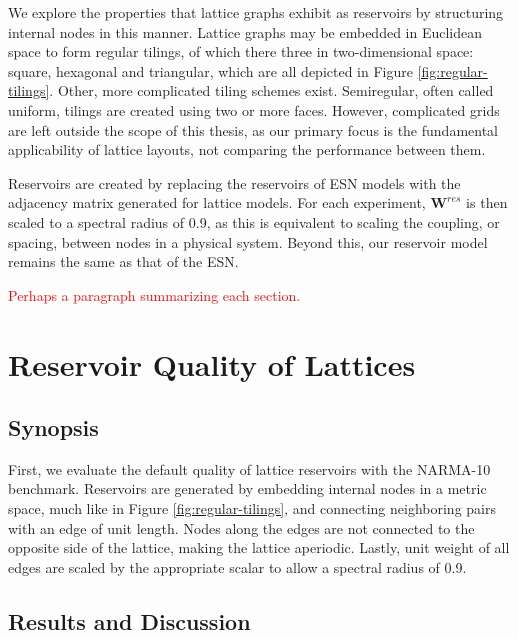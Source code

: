 We explore the properties that lattice graphs exhibit as reservoirs by
structuring internal nodes in this manner. Lattice graphs may be embedded in
Euclidean space to form regular tilings, of which there three in two-dimensional
space: square, hexagonal and triangular, which are all depicted in Figure
\ref{fig:regular-tilings}. Other, more complicated tiling schemes
exist. Semiregular, often called uniform, tilings are created using two or more
faces. However, complicated grids are left outside the scope of this thesis, as
our primary focus is the fundamental applicability of lattice layouts, not
comparing the performance between them.

Reservoirs are created by replacing the reservoirs of ESN models with the
adjacency matrix generated for lattice models. For each experiment,
$\mathbf{W}^{res}$ is then scaled to a spectral radius of 0.9, as this is
equivalent to scaling the coupling, or spacing, between nodes in a physical
system. Beyond this, our reservoir model remains the same as that of the ESN.

\textcolor{red}{
  Perhaps a paragraph summarizing each section.
}

\section{Reservoir Quality of Lattices}
\label{sec:lattice-quality}

\subsection{Synopsis}

First, we evaluate the default quality of lattice reservoirs with the NARMA-10
benchmark. Reservoirs are generated by embedding internal nodes in a metric
space, much like in Figure \ref{fig:regular-tilings}, and connecting neighboring
pairs with an edge of unit length. Nodes along the edges are not connected to
the opposite side of the lattice, making the lattice aperiodic. Lastly, unit
weight of all edges are scaled by the appropriate scalar to allow a spectral
radius of 0.9.

\subsection{Results and Discussion}

